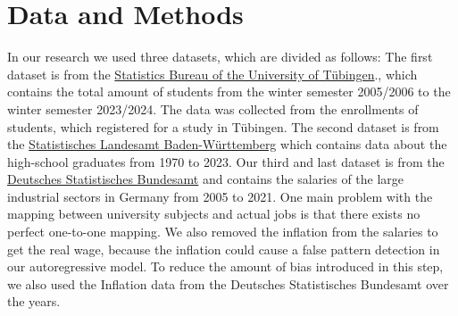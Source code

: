 \documentclass{article}
\theoremstyle{plain}
\theoremstyle{definition}
\theoremstyle{remark}
\begin{document}
\section{Data and Methods}\label{sec:methods}
In our research we used three datasets, which are divided as follows: The first dataset is from the \href{https://uni-tuebingen.de/einrichtungen/verwaltung/iv-studierende/studierendenabteilung/statistiken/}{Statistics Bureau of the University of Tübingen}., which contains the
total amount of students from the winter semester 2005/2006 to the winter semester 2023/2024. The data was collected from the enrollments of students, which registered 
for a study in Tübingen.
The second dataset is from the \href{https://www.statistik-bw.de/BildungKultur/SchulenAllgem/LRt0302.jsp}{Statistisches Landesamt Baden-Württemberg} which contains data about the high-school graduates from 1970 to 2023.
Our third and last dataset is from the \href{https://www-genesis.destatis.de/genesis//online?operation=table&code=62321-0001&bypass=true&levelindex=0&levelid=1702307320529#abreadcrumb}{Deutsches Statistisches Bundesamt} and contains the salaries of the large industrial sectors in Germany from 2005 to 2021. 
One main problem with the mapping between university subjects and actual jobs is that there exists no perfect one-to-one mapping. 
We also removed the inflation from the salaries to get the real wage, because the inflation could 
cause a false pattern detection in our autoregressive model. 
To reduce the amount of bias introduced in this step, we also used the Inflation data from the Deutsches Statistisches Bundesamt over the years.\\
\end{document}

